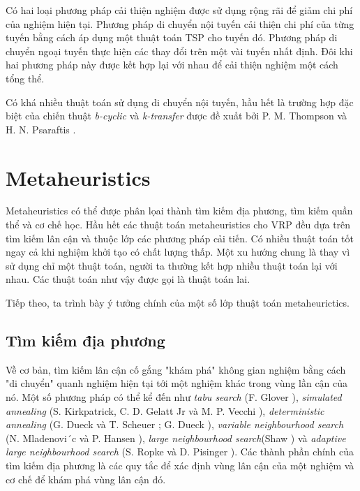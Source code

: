 Có hai loại phương pháp cải thiện nghiệm được sử dụng rộng rãi để giảm chi phí của nghiệm hiện tại. Phương pháp di chuyển nội tuyến cải thiện chi phí của từng tuyến bằng cách áp dụng một thuật toán TSP cho tuyến đó. Phương pháp di chuyển ngoại tuyến thực hiện các thay đổi trên một vài tuyến nhất định. Đôi khi hai phương pháp này được kết hợp lại với nhau để cải thiện nghiệm một cách tổng thể.

Có khá nhiều thuật toán sử dụng di chuyển nội tuyến, hầu hết là trường hợp đặc biệt của chiến thuật \textit{b-cyclic} và \textit{k-transfer} được đề xuất bởi P. M. Thompson và H. N. Psaraftis \cite{thompson1993cyclic}. 

\section{Metaheuristics}

Metaheuristics có thể được phân lọai thành tìm kiếm địa phương, tìm kiếm quần thể và cơ chế học. Hầu hết các thuật toán metaheuristics cho VRP đều dựa trên tìm kiếm lân cận và thuộc lớp các phương pháp cải tiến. Có nhiều thuật toán tốt ngay cả khi nghiệm khởi tạo có chất lượng thấp. Một xu hướng chung là thay vì sử dụng chỉ một thuật toán, người ta thường kết hợp nhiều thuật toán lại với nhau. Các thuật toán như vậy được gọi là thuật toán lai.

Tiếp theo, ta trình bày ý tưởng chính của một số lớp thuật toán metaheurictics.

\subsection{Tìm kiếm địa phương}

Về cơ bản, tìm kiếm lân cận cố gắng "khám phá" không gian nghiệm bằng cách "di chuyển" quanh nghiệm hiện tại tới một nghiệm khác trong vùng lần cận của nó. Một số phương pháp có thể kể đến như \textit{tabu search} (F. Glover \cite{glover1986future}), \textit{simulated annealing} (S. Kirkpatrick, C. D. Gelatt Jr và M. P. Vecchi \cite{kirkpatrick1983optimization}), \textit{deterministic annealing} (G. Dueck và T. Scheuer \cite{dueck1990threshold}; G. Dueck \cite{dueck1993new}), \textit{variable neighbourhood search} (N. Mladenovi´c và P. Hansen \cite{mladenovic1997variable}), \textit{large neighbourhood search}(Shaw \cite{shaw1998using}) và \textit{adaptive large neighbourhood search} (S. Ropke và D. Pisinger \cite{ropke2006adaptive}). Các thành phần chính của tìm kiếm địa phương là các quy tắc để xác định vùng lân cận của một nghiệm và cơ chế để khám phá vùng lân cận đó.

